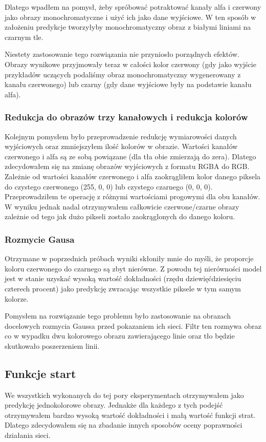 \documentclass{article}
\begin{document}
Dlatego wpadłem na pomysł, żeby spróbować potraktować kanały alfa i czerwony jako obrazy monochromatyczne i użyć ich jako dane wyjściowe.
W ten sposób w założeniu predykcje tworzyłyby monochromatyczny obraz z białymi liniami na czarnym tle.

Niestety zastosowanie tego rozwiązania nie przyniosło porządnych efektów.
Obrazy wynikowe przyjmowały teraz w całości kolor czerwony (gdy jako wyjście przykładów uczących podaliśmy obraz monochromatyczny wygenerowany z kanału czerwonego) lub
czarny (gdy dane wyjściowe były na podstawie kanału alfa).
\subsubsection{Redukcja do obrazów trzy kanałowych i redukcja kolorów}
Kolejnym pomysłem było przeprowadzenie redukcję wymiarowości danych wyjściowych oraz zmniejszyłem ilość kolorów w obrazie.
Wartości kanałów czerwonego i alfa są ze sobą powiązane (dla tła obie zmierzają do zera).
Dlatego zdecydowałem się na zmianę obrazów wyjściowych z formatu RGBA do RGB.
Zależnie od wartości kanałów czerwonego i alfa zaokrągliłem kolor danego piksela do czystego czerwonego (255, 0, 0) lub czystego czarnego (0, 0, 0).
Przeprowadziłem te operację z różnymi wartościami progowymi dla obu kanałów.
W wyniku jednak nadal otrzymywałem całkowicie czerwone/czarne obrazy zależnie od tego jak dużo pikseli zostało zaokrąglonych do danego koloru.

\subsubsection{Rozmycie Gausa}
Otrzymane w poprzednich próbach wyniki skłoniły mnie do myśli, że proporcje koloru czerwonego do czarnego są zbyt nierówne.
Z powodu tej nierówności model jest w stanie uzyskać wysoką wartość dokładności (rzędu dziewięćdziesięciu czterech procent) jako predykcję zwracając wszystkie piksele w tym samym kolorze.

Pomysłem na rozwiązanie tego problemu było zastosowanie na obrazach docelowych rozmycia Gaussa przed pokazaniem ich sieci.
Filtr ten rozmywa obraz co w wypadku dwu kolorowego obrazu zawierającego linie oraz tło będzie skutkowało poszerzeniem linii.
\subsection{Funkcje start}
We wszystkich wykonanych do tej pory eksperymentach otrzymywałem jako predykcję jednokolorowe obrazy.
Jednakże dla każdego z tych podejść otrzymywałem bardzo wysoką wartość dokładności i małą wartość funkcji strat.
Dlatego zdecydowałem się na zbadanie innych sposobów oceny poprawności działania sieci.
\end{document}
